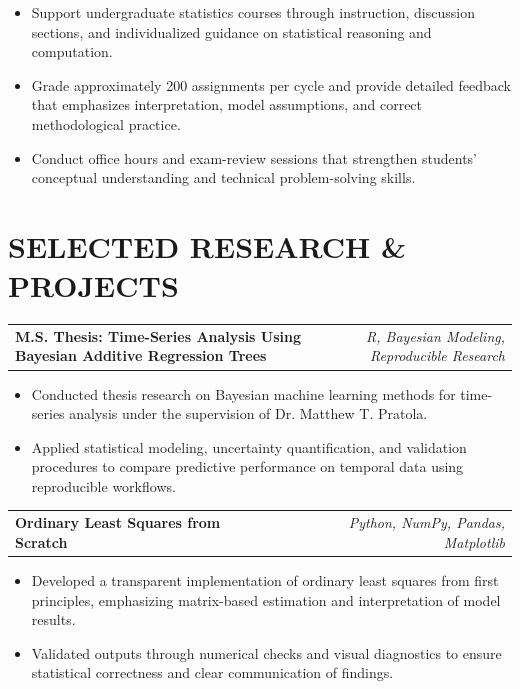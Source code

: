 \documentclass[10pt,letterpaper]{article}
\makeatletter
\newcommand{\projectEntry}[2]{%
  \begin{tabularx}{\textwidth}{@{}Xr@{}}
    \textbf{#1} & \textit{#2}
  \end{tabularx}%
}
\newenvironment{resumeItems}{%
  \begin{itemize}[
    label=\textbullet,
    leftmargin=14pt,
    labelsep=5pt,
    itemsep=0.5pt,
    topsep=1.0pt,
    parsep=0pt,
    partopsep=0pt
  ]
}{%
  \end{itemize}
}
\makeatother
\begin{document}
\begin{resumeItems}
  \item Support undergraduate statistics courses through instruction, discussion sections, and individualized guidance on statistical reasoning and computation.

  \item Grade approximately 200 assignments per cycle and provide detailed feedback that emphasizes interpretation, model assumptions, and correct methodological practice.

  \item Conduct office hours and exam-review sessions that strengthen students' conceptual understanding and technical problem-solving skills.
\end{resumeItems}

\section*{SELECTED RESEARCH \& PROJECTS}

\projectEntry
  {M.S. Thesis: Time-Series Analysis Using Bayesian Additive Regression Trees}
  {R, Bayesian Modeling, Reproducible Research}

\begin{resumeItems}
  \item Conducted thesis research on Bayesian machine learning methods for time-series analysis under the supervision of Dr. Matthew T. Pratola.

  \item Applied statistical modeling, uncertainty quantification, and validation procedures to compare predictive performance on temporal data using reproducible workflows.
\end{resumeItems}

\vspace{0.7pt}

\projectEntry
  {Ordinary Least Squares from Scratch}
  {Python, NumPy, Pandas, Matplotlib}

\begin{resumeItems}
  \item Developed a transparent implementation of ordinary least squares from first principles, emphasizing matrix-based estimation and interpretation of model results.

  \item Validated outputs through numerical checks and visual diagnostics to ensure statistical correctness and clear communication of findings.
\end{resumeItems}
\end{document}
